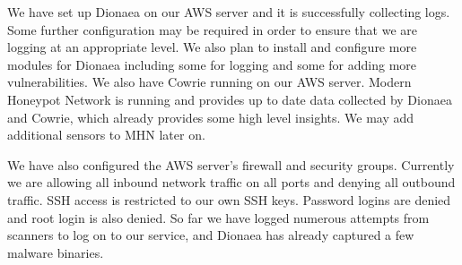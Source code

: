 We have set up Dionaea on our AWS server and it is successfully collecting logs. Some further configuration may be required in order to ensure that we are logging at an appropriate level. We also plan to install and configure more modules for Dionaea including some for logging and some for adding more vulnerabilities. We also have Cowrie running on our AWS server. Modern Honeypot Network is running and provides up to date data collected by Dionaea and Cowrie, which already provides some high level insights. We may add additional sensors to MHN later on. 

We have also configured the AWS server's firewall and security groups. Currently we are allowing all inbound network traffic on all ports and denying all outbound traffic. SSH access is restricted to our own SSH keys. Password logins are denied and root login is also denied. So far we have logged numerous attempts from scanners to log on to our service, and Dionaea has already captured a few malware binaries. 
